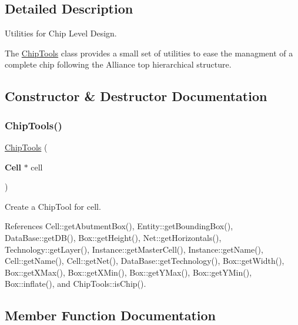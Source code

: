 \subsection{Detailed Description}
Utilities for Chip Level Design. 

The \hyperlink{classKatabatic_1_1ChipTools}{Chip\+Tools} class provides a small set of utilities to ease the managment of a complete chip following the Alliance top hierarchical structure. 

\subsection{Constructor \& Destructor Documentation}
\mbox{\label{classKatabatic_1_1ChipTools_a5296f5ccb380869255d774b70e237686}} 
\subsubsection{\texorpdfstring{Chip\+Tools()}{ChipTools()}}
{\footnotesize\ttfamily \hyperlink{classKatabatic_1_1ChipTools}{Chip\+Tools} (\begin{DoxyParamCaption}\item[{\textbf{ Cell} $\ast$}]{cell }\end{DoxyParamCaption})}

Create a Chip\+Tool for {\ttfamily cell}. 

References Cell\+::get\+Abutment\+Box(), Entity\+::get\+Bounding\+Box(), Data\+Base\+::get\+D\+B(), Box\+::get\+Height(), Net\+::get\+Horizontals(), Technology\+::get\+Layer(), Instance\+::get\+Master\+Cell(), Instance\+::get\+Name(), Cell\+::get\+Name(), Cell\+::get\+Net(), Data\+Base\+::get\+Technology(), Box\+::get\+Width(), Box\+::get\+X\+Max(), Box\+::get\+X\+Min(), Box\+::get\+Y\+Max(), Box\+::get\+Y\+Min(), Box\+::inflate(), and Chip\+Tools\+::is\+Chip().



\subsection{Member Function Documentation}
\mbox{\label{classKatabatic_1_1ChipTools_ab6b7bc2b47ead460ac00a531451dc9cf}} 
